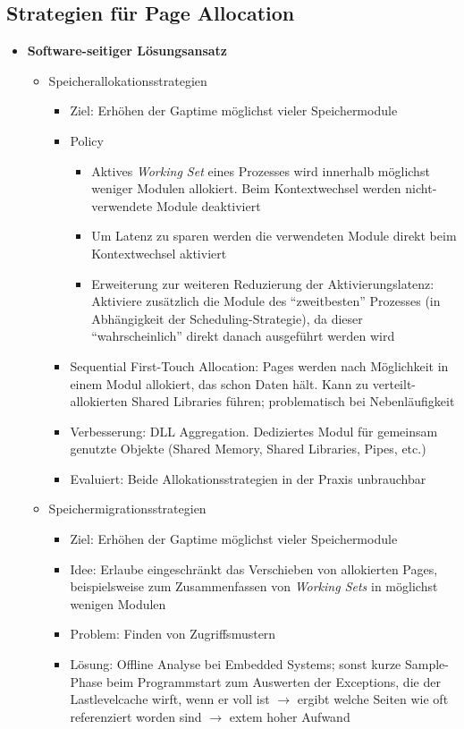 \subsection{Strategien für Page Allocation}
\begin{itemize}
	\item \textbf{Software-seitiger Lösungsansatz}
	\begin{itemize}
		\item Speicherallokationsstrategien
		\begin{itemize}
			\item Ziel: Erhöhen der Gaptime möglichst vieler Speichermodule
			\item Policy
			\begin{itemize}
				\item Aktives \textit{Working Set} eines Prozesses wird innerhalb möglichst weniger Modulen allokiert. Beim Kontextwechsel werden nicht-verwendete Module deaktiviert
				\item Um Latenz zu sparen werden die verwendeten Module direkt beim Kontextwechsel aktiviert
				\item Erweiterung zur weiteren Reduzierung der Aktivierungslatenz: Aktiviere zusätzlich die Module des "`zweitbesten"' Prozesses (in Abhängigkeit der Scheduling-Strategie), da dieser "`wahrscheinlich"' direkt danach ausgeführt werden wird
			\end{itemize}
			\item Sequential First-Touch Allocation: Pages werden nach Möglichkeit in einem Modul allokiert, das schon Daten hält. Kann zu verteilt-allokierten Shared Libraries führen; problematisch bei Nebenläufigkeit
			\item Verbesserung: DLL Aggregation. Dediziertes Modul für gemeinsam genutzte Objekte (Shared Memory, Shared Libraries, Pipes, etc.)
			\item Evaluiert: Beide Allokationsstrategien in der Praxis unbrauchbar
		\end{itemize}
		\item Speichermigrationsstrategien
		\begin{itemize}
			\item Ziel: Erhöhen der Gaptime möglichst vieler Speichermodule
			\item Idee: Erlaube eingeschränkt das Verschieben von allokierten Pages, beispielsweise zum Zusammenfassen von \textit{Working Sets} in möglichst wenigen Modulen
			\item Problem: Finden von Zugriffsmustern
			\item Lösung: Offline Analyse bei Embedded Systems; sonst kurze Sample-Phase beim Programmstart zum Auswerten der Exceptions, die der Lastlevelcache wirft, wenn er voll ist \(\rightarrow\) ergibt welche Seiten wie oft referenziert worden sind \(\rightarrow\) extem hoher Aufwand

\end{itemize}
\end{itemize}
\end{itemize}
